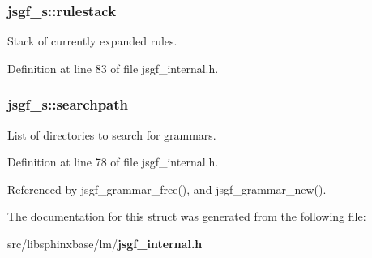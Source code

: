 \subsubsection[{rulestack}]{ jsgf\-\_\-s\-::rulestack}\label{structjsgf__s_a0980112df6f2f591e64158266eb04b69}


Stack of currently expanded rules. 



Definition at line 83 of file jsgf\-\_\-internal.\-h.

\subsubsection[{searchpath}]{ jsgf\-\_\-s\-::searchpath}\label{structjsgf__s_aabb207f0909c661a831e5f931dd9f60e}


List of directories to search for grammars. 



Definition at line 78 of file jsgf\-\_\-internal.\-h.



Referenced by jsgf\-\_\-grammar\-\_\-free(), and jsgf\-\_\-grammar\-\_\-new().



The documentation for this struct was generated from the following file\-:\begin{DoxyCompactItemize}
\item 
src/libsphinxbase/lm/{\bf jsgf\-\_\-internal.\-h}\end{DoxyCompactItemize}
